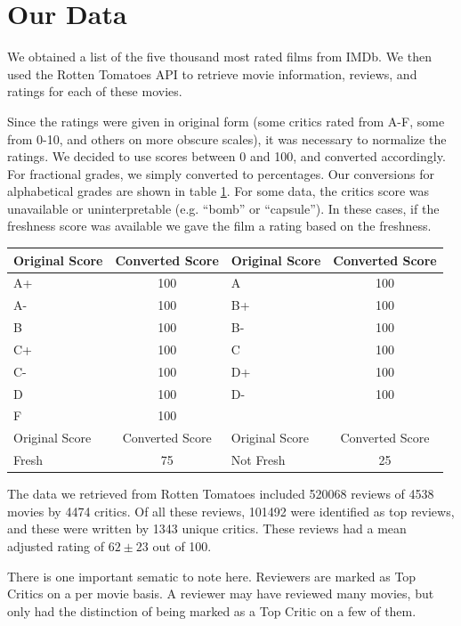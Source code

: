 \documentclass[12pt]{article}
\begin{document}
\section{Our Data}

We obtained a list of the five thousand most rated films from IMDb. We then 
used the Rotten Tomatoes API to retrieve movie information, reviews, and 
ratings for each of these movies.  

Since the ratings were given in original form (some critics rated from A-F, 
some from 0-10, and others on more obscure scales), it was necessary to 
normalize the ratings. We decided to use scores between 0 and 100, and converted
accordingly. For fractional grades, we simply converted to percentages. Our 
conversions for alphabetical grades are shown in table \ref{tab:conv}. For some 
data, the critics score was unavailable or uninterpretable (e.g. ``bomb'' or 
``capsule''). In these cases, if the freshness score was available we gave the 
film a rating based on the freshness.

\begin{table}[H]
\centering
\begin{tabular}{ | l | c | l | c |}

\hline
Original Score & Converted Score & Original Score & Converted Score \\
\hline
A+ & 100 & A  & 100 \\
A- & 100 & B+ & 100 \\
B  & 100 & B- & 100 \\
C+ & 100 & C  & 100 \\
C- & 100 & D+ & 100 \\
D  & 100 & D- & 100 \\
F  & 100 &    &     \\
\hline
Original Score & Converted Score & Original Score & Converted Score \\
\hline
Fresh & 75 & Not Fresh & 25 \\
\hline
\end{tabular}
\label{tab:conv}
\end{table}

The data we retrieved from Rotten Tomatoes included 520068 reviews of 4538 
movies by 4474 critics. Of all these reviews, 101492 were identified as top 
reviews, and these were written by 1343 unique critics. These reviews had a 
mean adjusted rating of $ 62 \pm 23$ out of 100.

There is one important sematic to note here. Reviewers are marked as Top 
Critics on a per movie basis. A reviewer may have reviewed many movies, but 
only had the distinction of being marked as a Top Critic on a few of them. 
\end{document}
